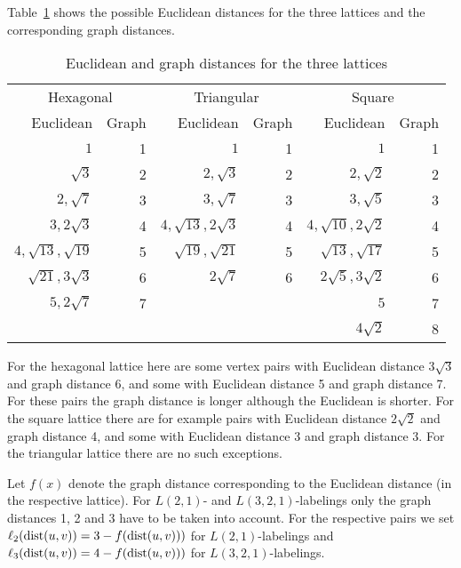 \documentclass[smallextended]{svjour3}
\def\dist{\mathop{\rm dist}}
\begin{document}
Table~\ref{tab:2} shows the possible Euclidean distances for the three lattices 
and the corresponding graph distances. 

\begin{table}[h] 
\begin{center} 
\renewcommand{\arraystretch}{1.3} 
\renewcommand{\tabcolsep}{8pt} 
\begin{tabular}{|r|r||r|r||r|r|} 
\hline 
\multicolumn{2}{|c||}{Hexagonal} & \multicolumn{2}{c||}{Triangular} & \multicolumn{2}{c|}{Square} \\ 
 Euclidean & Graph & Euclidean & Graph & Euclidean & Graph\\ 
\hline 
$1$                              & 1  & $1$                              & 1 & $1$ & 1\\ 
$\sqrt{3}$                    & 2   & $2,\sqrt{3}$                 & 2 & $2,\sqrt{2}$ & 2\\ 
$2,\sqrt{7}$                 & 3   & $3,\sqrt{7}$                 & 3 & $3,\sqrt{5}$ & 3\\ 
$3,2\sqrt{3}$               & 4   & $4,\sqrt{13},2\sqrt{3}$ & 4 & $4,\sqrt{10},2\sqrt{2}$ & 4\\ 
$4,\sqrt{13},\sqrt{19}$ & 5  & $\sqrt{19},\sqrt{21}$    & 5 & $\sqrt{13},\sqrt{17}$ & 5\\ 
$\sqrt{21},3\sqrt{3}$   & 6   & $2\sqrt{7}$                  & 6 & $2\sqrt{5},3\sqrt{2}$ & 6\\ 
$5,2\sqrt{7}$               & 7  &                                     &   & $5$ & 7\\ 
                               &     &                                         &   & $4\sqrt{2}$ & 8\\ 
\hline 
\end{tabular} 
\end{center} 
\caption{Euclidean and graph distances for the three lattices}\label{tab:2} 
\end{table} 

For the hexagonal lattice here are some vertex pairs with Euclidean distance $3\sqrt{3}$ 
and graph distance 6, and some with Euclidean distance 5 and graph 
distance 7. For these pairs the graph distance is longer although the 
Euclidean is shorter. For the square lattice there are for example 
pairs with Euclidean distance $2\sqrt{2}$ 
and graph distance 4, and some with Euclidean distance 3 and graph 
distance 3. For the triangular lattice there are no such exceptions. 

Let $f(x)$ denote the graph distance corresponding to the Euclidean distance (in the 
respective lattice). 
For $L(2,1)$- and $L(3,2,1)$-labelings only the graph distances 1, 2 and 3 have to be taken into account. 
For the respective pairs we set $\ell_2(\dist(u,v))=3-f(\dist(u,v)))$ 
for $L(2,1)$-labelings and $\ell_3(\dist(u,v))=4-f(\dist(u,v)))$ for $L(3,2,1)$-labelings. 
\end{document}
